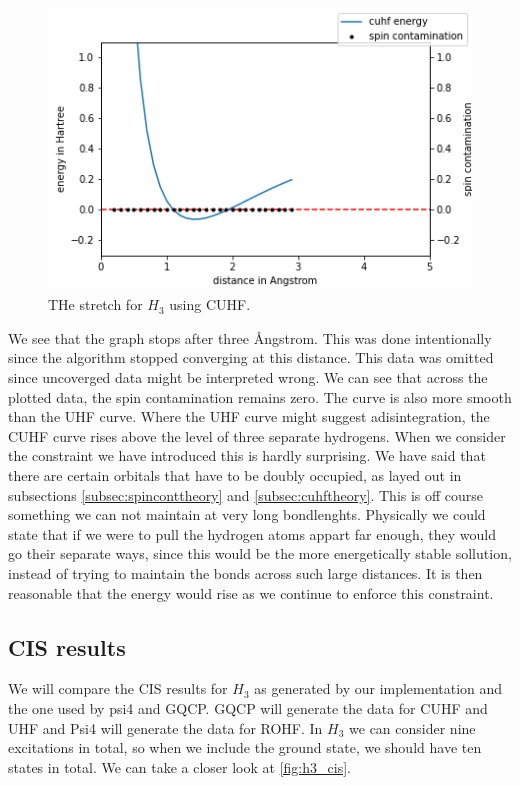 \documentclass[twoside,twocolumn,9pt]{article}
\begin{document}
\begin{center}
  \begin{figure}[h]
    \includegraphics[width=\linewidth]{./../notes/figures/cuhf_mix_h3.png}
    \caption{THe stretch for $H_3$ using CUHF.}
    \label{fig:cuhf_h3}
  \end{figure}
\end{center}
We see that the graph stops after three \si{\angstrom}ngstrom. This was done intentionally since the algorithm stopped converging at this distance. This data was omitted since 
uncoverged data might be interpreted wrong. We can see that across the plotted data, the spin contamination remains zero. The curve is also more smooth than the UHF curve. Where 
the UHF curve might suggest adisintegration, the CUHF curve rises above the level of three separate hydrogens. When we consider the constraint we have introduced this is hardly
surprising. We have said that there are certain orbitals that have to be doubly occupied, as layed out in subsections \ref{subsec:spinconttheory} and \ref{subsec:cuhftheory}.
This is off course something we can not maintain at very long bondlenghts. Physically we could state that if we were to pull the hydrogen atoms appart far enough, they would go 
their separate ways, since this would be the more energetically stable sollution, instead of trying to maintain the bonds across such large distances. It is then reasonable that
the energy would rise as we continue to enforce this constraint.

\subsection{CIS results}
\label{subsec:cis}
We will compare the CIS results for $H_3$ as generated by our implementation and the one used by psi4 and GQCP. GQCP will generate the data for CUHF and UHF and Psi4 will generate
the data for ROHF. In $H_3$ we can consider nine excitations in total, so when we include the ground state, we should have ten states in total. We can take a closer look at
\ref{fig:h3_cis}.
\end{document}
